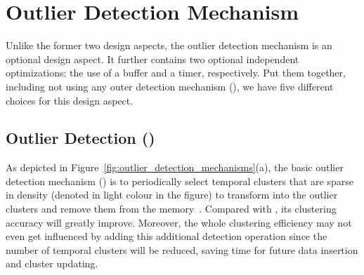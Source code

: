 \section{Outlier Detection Mechanism}
\label{sec:outlier_detection_mechanism}
Unlike the former two design aspects, the outlier detection mechanism is an optional design aspect. It further contains two optional independent optimizations: the use of a buffer and a timer, respectively. 
Put them together, including not using any outer detection mechanism (\nod), we have five different choices for this design aspect. 


\subcompact
\subsection{Outlier Detection (\od)}
\label{subsec:detection}
As depicted in Figure~\ref{fig:outlier_detection_mechanisms}(a), 
the basic outlier detection mechanism (\od) is to periodically select temporal clusters that are sparse in density (denoted in light colour in the figure) to transform into the outlier clusters and remove them from the memory~\cite{Clustream:03,DStream:2007}. Compared with \nod, its clustering accuracy will greatly improve. Moreover, the whole clustering efficiency may not even get influenced by adding this additional detection operation since the number of temporal clusters will be reduced, saving time for future data insertion and cluster updating.


